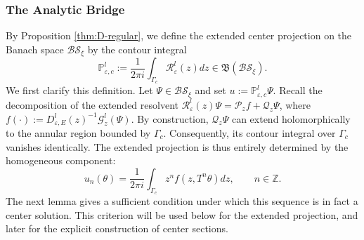 \documentclass[reqno,11pt]{amsart}
\newcommand{\Z}{{\mathbb Z}}
\begin{document}
\subsubsection{The Analytic Bridge}
 By Proposition \ref{thm:D-regular}, we define the extended center projection on the Banach space $\mathcal{BS}_\xi$ by the contour integral
\begin{equation}\label{eq:ambient-P-def}
\mathbb{ P }_{\varepsilon, c}^{l}
:=
\frac{1}{2\pi i}\int_{\Gamma_c}\mathcal R^{l}_\varepsilon(z) dz
\in \mathfrak{B}(\mathcal{BS}_\xi).
\end{equation}
 We first clarify this definition. Let $\Psi \in \mathcal{BS}_\xi$ and set $u := \mathbb{ P }_{\varepsilon,c}^{l}\Psi$. Recall the decomposition of the extended resolvent $\mathcal{R}_\varepsilon^l(z)\Psi = \mathcal{P}_z f + \mathcal{Q}_z \Psi$, where  $f(\cdot) := D_{\varepsilon,E}^{ l}(z)^{-1}\mathcal{G}_z^l(\Psi)$. By construction,  $\mathcal Q_z\Psi$ can extend holomorphically to the annular region
bounded by $\Gamma_c$.  Consequently, its contour integral over $\Gamma_c$ vanishes identically. The extended projection is thus entirely determined by the homogeneous component:
$$
u_n(\theta) = \frac{1}{2\pi i}\int_{\Gamma_c} z^n f(z,T^n\theta) dz, \qquad n\in\Z.
$$
The next lemma gives a sufficient condition under which this sequence
is in fact a center solution. This criterion will be used below for the extended projection, and later for the
explicit construction of center sections.
\end{document}
